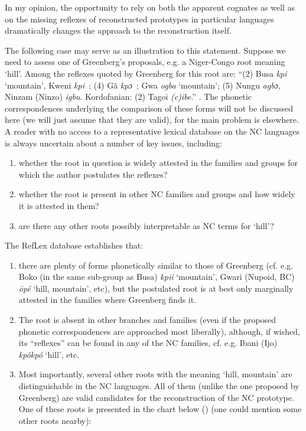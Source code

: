 In my opinion, the opportunity to rely on both the apparent cognates as well as on the missing reflexes of reconstructed prototypes in particular languages dramatically changes the approach to the reconstruction itself.

The following case may serve as an illustration to this statement. Suppose we need to assess one of Greenberg’s proposals, e.g. a Niger-Congo root meaning ‘hill’. Among the reflexes quoted by Greenberg for this root are: “(2) Busa \textit{kpi} ‘mountain’, Kweni  \textit{kpi~}; (4) Gã \textit{kpɔ~}; Gwa \textit{ogba} ‘mountain’; (5) Nungu \textit{agbɔ}, Ninzam (Ninzo) \textit{igbu}. Kordofanian: (2) Tagoi \textit{(c)ibe}.” \citep[155]{Greenberg1966}. The phonetic correspondences underlying the comparison of these forms will not be discussed here (we will just assume that they are valid), for the main problem is elsewhere. A reader with no access to a representative lexical database on the NC languages is always uncertain about a number of key issues, including:

\begin{enumerate}
\item whether the root in question is widely attested in the families and groups for which the author postulates the reflexes?
\item whether the root is present in other NC families and groups and how widely it is attested in them?
\item are there any other roots possibly interpretable as NC terms for ‘hill’?
\end{enumerate}
The RefLex database establishes  that: 

\begin{enumerate}
\item there are plenty of forms phonetically similar to those of Greenberg (cf. e.g. Boko (in the same sub-group as Busa) \textit{kpii} ‘mountain’, Gwari (Nupoid, BC) \textit{{\={o}}p{\'{e}}} ‘hill, mountain’, etc), but the postulated root is at best only marginally attested in the families where Greenberg finds it. 
\item The root is absent in other branches and families (even if the proposed phonetic correspondences are approached most liberally), although, if wished, its “reflexes” can be found in any of the NC families, cf. e.g. Ibani (Ijo) \textit{kp{\'{o}}kp{\'{o}}} ‘hill’, etc. 
\item Most importantly, several other roots with the meaning ‘hill, mountain’ are distinguishable in the NC languages. All of them (unlike the one proposed by Greenberg) are valid candidates for the reconstruction of the NC prototype. One of these roots is presented in the chart below () (one could mention some other roots nearby):
\end{enumerate}


